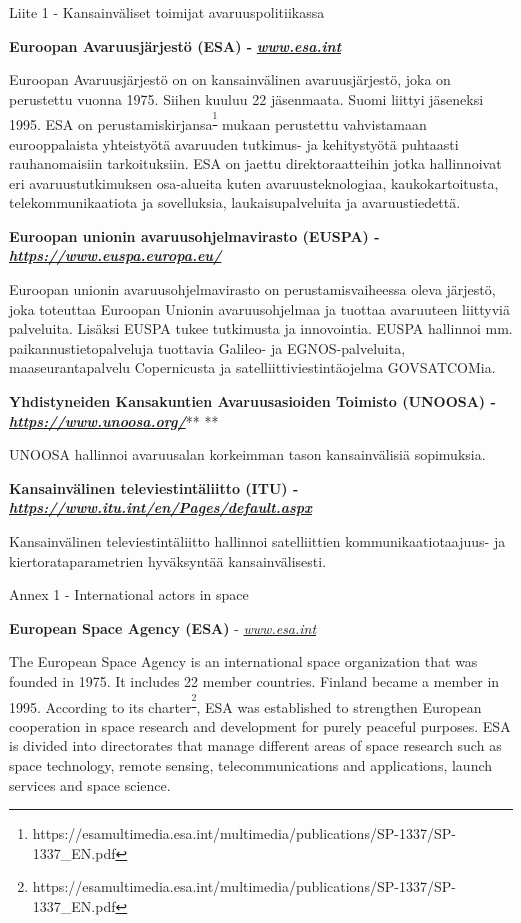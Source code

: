 \protect\hypertarget{anchor-16}{}{}Liite 1 - Kansainväliset toimijat
avaruuspolitiikassa

\textbf{Euroopan Avaruusjärjestö (ESA) -
}\href{http://www.esa.int}{\textbf{\emph{www.esa.int}}}

Euroopan Avaruusjärjestö on on kansainvälinen avaruusjärjestö, joka on
perustettu vuonna 1975. Siihen kuuluu 22 jäsenmaata. Suomi liittyi
jäseneksi 1995. ESA on perustamiskirjansa\textsuperscript{\footnote{https://esamultimedia.esa.int/multimedia/publications/SP-1337/SP-1337\_EN.pdf}}
mukaan perustettu vahvistamaan eurooppalaista yhteistyötä avaruuden
tutkimus- ja kehitystyötä puhtaasti rauhanomaisiin tarkoituksiin. ESA on
jaettu direktoraatteihin jotka hallinnoivat eri avaruustutkimuksen
osa-alueita kuten avaruusteknologiaa, kaukokartoitusta,
telekommunikaatiota ja sovelluksia, laukaisupalveluita ja
avaruustiedettä.

\textbf{Euroopan unionin avaruusohjelmavirasto (EUSPA) -
}\href{https://www.euspa.europa.eu/}{\textbf{\emph{https://www.euspa.europa.eu/}}}

Euroopan unionin avaruusohjelmavirasto on perustamisvaiheessa oleva
järjestö, joka toteuttaa Euroopan Unionin avaruusohjelmaa ja tuottaa
avaruuteen liittyviä palveluita. Lisäksi EUSPA tukee tutkimusta ja
innovointia. EUSPA hallinnoi mm. paikannustietopalveluja tuottavia
Galileo- ja EGNOS-palveluita, maaseurantapalvelu Copernicusta ja
satelliittiviestintäojelma GOVSATCOMia.

\textbf{Yhdistyneiden Kansakuntien Avaruusasioiden Toimisto (UNOOSA) -
}\href{https://www.unoosa.org/}{\textbf{\emph{https://www.unoosa.org/}}}**
**

UNOOSA hallinnoi avaruusalan korkeimman tason kansainvälisiä sopimuksia.

\textbf{Kansainvälinen televiestintäliitto (ITU) -
}\href{https://www.itu.int/en/Pages/default.aspx}{\textbf{\emph{https://www.itu.int/en/Pages/default.aspx}}}

Kansainvälinen televiestintäliitto hallinnoi satelliittien
kommunikaatiotaajuus- ja kiertorataparametrien hyväksyntää
kansainvälisesti.

\protect\hypertarget{anchor-17}{}{}Annex 1 - International actors in
space

\textbf{European Space Agency (ESA)} -
\href{http://www.esa.int}{\emph{www.esa.int}}

The European Space Agency is an international space organization that
was founded in 1975. It includes 22 member countries. Finland became a
member in 1995. According to its charter\textsuperscript{\footnote{https://esamultimedia.esa.int/multimedia/publications/SP-1337/SP-1337\_EN.pdf}},
ESA was established to strengthen European cooperation in space research
and development for purely peaceful purposes. ESA is divided into
directorates that manage different areas of space research such as space
technology, remote sensing, telecommunications and applications, launch
services and space science.


